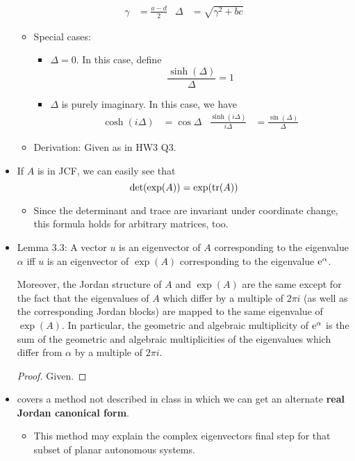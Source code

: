 \documentclass[../notes.tex]{subfiles}
\begin{document}
\begin{itemize}
\begin{align*}
        \gamma &= \frac{a-d}{2}&
        \Delta &= \sqrt{\gamma^2+bc}
    \end{align*}
    \begin{itemize}
        \item Special cases:
        \begin{itemize}
            \item $\Delta=0$. In this case, define
            \begin{equation*}
                \frac{\sinh(\Delta)}{\Delta} = 1
            \end{equation*}
            \item $\Delta$ is purely imaginary. In this case, we have
            \begin{align*}
                \cosh(i\Delta) &= \cos\Delta&
                \frac{\sinh(i\Delta)}{i\Delta} &= \frac{\sin(\Delta)}{\Delta}
            \end{align*}
        \end{itemize}
        \item Derivation: Given as in HW3 Q3.
    \end{itemize}
    \item If $A$ is in JCF, we can easily see that
    \begin{equation*}
        \det(\exp(A)) = \exp(\trace(A))
    \end{equation*}
    \begin{itemize}
        \item Since the determinant and trace are invariant under coordinate change, this formula holds for arbitrary matrices, too.
    \end{itemize}
    \item Lemma 3.3: A vector $u$ is an eigenvector of $A$ corresponding to the eigenvalue $\alpha$ iff $u$ is an eigenvector of $\exp(A)$ corresponding to the eigenvalue $\e[\alpha]$.\par
    Moreover, the Jordan structure of $A$ and $\exp(A)$ are the same except for the fact that the eigenvalues of $A$ which differ by a multiple of $2\pi i$ (as well as the corresponding Jordan blocks) are mapped to the same eigenvalue of $\exp(A)$. In particular, the geometric and algebraic multiplicity of $\e[\alpha]$ is the sum of the geometric and algebraic multiplicities of the eigenvalues which differ from $\alpha$ by a multiple of $2\pi i$.
    \begin{proof}
        Given.
    \end{proof}
    \item \textcite{bib:Teschl} covers a method not described in class in which we can get an alternate \textbf{real Jordan canonical form}.
    \begin{itemize}
        \item This method may explain the complex eigenvectors final step for that subset of planar autonomous systems.
    \end{itemize}
\end{itemize}
\end{document}
